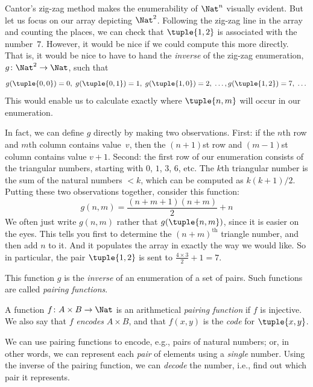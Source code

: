 \documentclass[../../../include/open-logic-section]{subfiles}
\begin{document}

\begin{explain}
Cantor's zig-zag method makes the enumerability of $\Nat^n$ visually
evident. But let us focus on our array depicting $\Nat^2$. Following
the zig-zag line in the array and counting the places, we can check
that $\tuple{1,2}$ is associated with the number~$7$. However, it would
be nice if we could compute this more directly. That is, it would be
nice to have to hand the \emph{inverse} of the zig-zag enumeration,
$g\colon \Nat^2 \to \Nat$, such that
\[
g(\tuple{0,0}) = 0, \;
g(\tuple{0,1}) = 1, \;
g(\tuple{1,0}) = 2, \; \dots,  
g(\tuple{1,2}) = 7, \; \dots
\]
This would enable us to calculate exactly where $\tuple{n, m}$ will occur
in our enumeration. 

In fact, we can define $g$ directly by making two observations. First:
if the $n$th row and $m$th column contains value~$v$, then the
$(n+1)$st row and $(m-1)$st column contains value $v + 1$. Second: the
first row of our enumeration consists of the triangular numbers,
starting with $0$, $1$, $3$, $6$, etc. The $k$th triangular number is
the sum of the natural numbers $< k$, which can be computed as
$k(k+1)/2$. Putting these two observations together, consider this
function:
\[
  g(n,m) = \frac{(n+m+1)(n+m)}{2} + n
\]
We often just write $g(n, m)$ rather that $g(\tuple{n, m})$, since it
is easier on the eyes. This tells you first to determine the
$(n+m)^\text{th}$ triangle number, and then add $n$ to it. And
it populates the array in exactly the way we would like. So in
particular, the pair $\tuple{1, 2}$ is sent to $\frac{4 \times 3}{2} +
1 = 7$. 

This function $g$ is the \emph{inverse} of an enumeration of a set of
pairs. Such functions are called \emph{pairing functions}.
\end{explain}

\begin{defn} 
  A function $f\colon A \times B \to \Nat$ is an arithmetical
  \emph{pairing function} if $f$ is injective. We also say that $f$
  \emph{encodes} $A \times B$, and that $f(x,y)$ is the
  \emph{code} for $\tuple{x,y}$.
\end{defn}

\begin{explain}
We can use pairing functions to encode, e.g., pairs of natural numbers;
or, in other words, we can represent each \emph{pair} of elements
using a \emph{single} number. Using the inverse of the pairing
function, we can \emph{decode} the number, i.e., find out which
pair it represents.
\end{explain}
\end{document}
